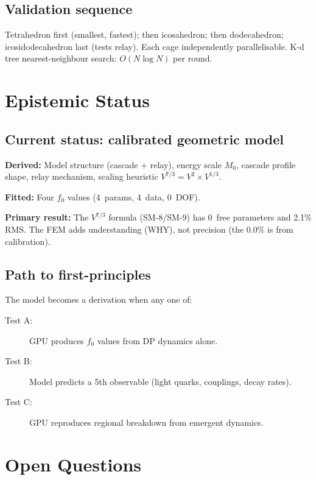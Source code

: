 \documentclass[11pt,letterpaper]{article}
\begin{document}
\subsection{Validation sequence}

Tetrahedron first (smallest, fastest); then icosahedron; then
dodecahedron; icosidodecahedron last (tests relay).  Each cage
independently parallelisable.  K-d tree nearest-neighbour search:
$O(N \log N)$ per round.

\section{Epistemic Status}
\label{sec:defense}

\subsection{Current status: calibrated geometric model}

\textbf{Derived:} Model structure (cascade + relay), energy scale
$M_0$, cascade profile shape, relay mechanism, scaling heuristic
$V^{7/3} = V^2 \times V^{1/3}$.

\textbf{Fitted:} Four $f_0$ values (4~params, 4~data, 0~DOF).

\textbf{Primary result:} The $V^{7/3}$ formula (SM-8/SM-9) has
0~free parameters and 2.1\% RMS.  The FEM adds understanding
(WHY), not precision (the $0.0\%$ is from calibration).

\subsection{Path to first-principles}

The model becomes a derivation when any one of:
\begin{description}
\item[Test A:] GPU produces $f_0$ values from DP dynamics alone.
\item[Test B:] Model predicts a 5th observable (light quarks,
  couplings, decay rates).
\item[Test C:] GPU reproduces regional breakdown from emergent
  dynamics.
\end{description}

\section{Open Questions}
\end{document}
